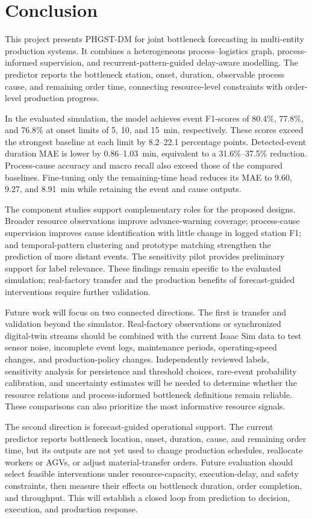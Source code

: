 \chapter{Conclusion}
\label{ch:conclusion}

This project presents PHGST-DM for joint bottleneck forecasting in multi-entity production systems. It combines a heterogeneous process--logistics graph, process-informed supervision, and recurrent-pattern-guided delay-aware modelling. The predictor reports the bottleneck station, onset, duration, observable process cause, and remaining order time, connecting resource-level constraints with order-level production progress.

In the evaluated simulation, the model achieves event F1-scores of 80.4\%, 77.8\%, and 76.8\% at onset limits of 5, 10, and 15~min, respectively. These scores exceed the strongest baseline at each limit by 8.2--22.1 percentage points. Detected-event duration MAE is lower by 0.86--1.03~min, equivalent to a 31.6\%--37.5\% reduction. Process-cause accuracy and macro recall also exceed those of the compared baselines. Fine-tuning only the remaining-time head reduces its MAE to 9.60, 9.27, and 8.91~min while retaining the event and cause outputs.

The component studies support complementary roles for the proposed designs. Broader resource observations improve advance-warning coverage; process-cause supervision improves cause identification with little change in logged station F1; and temporal-pattern clustering and prototype matching strengthen the prediction of more distant events. The sensitivity pilot provides preliminary support for label relevance. These findings remain specific to the evaluated simulation; real-factory transfer and the production benefits of forecast-guided interventions require further validation.

Future work will focus on two connected directions. The first is transfer and validation beyond the simulator. Real-factory observations or synchronized digital-twin streams should be combined with the current Isaac Sim data to test sensor noise, incomplete event logs, maintenance periods, operating-speed changes, and production-policy changes. Independently reviewed labels, sensitivity analysis for persistence and threshold choices, rare-event probability calibration, and uncertainty estimates will be needed to determine whether the resource relations and process-informed bottleneck definitions remain reliable. These comparisons can also prioritize the most informative resource signals.

The second direction is forecast-guided operational support. The current predictor reports bottleneck location, onset, duration, cause, and remaining order time, but its outputs are not yet used to change production schedules, reallocate workers or AGVs, or adjust material-transfer orders. Future evaluation should select feasible interventions under resource-capacity, execution-delay, and safety constraints, then measure their effects on bottleneck duration, order completion, and throughput. This will establish a closed loop from prediction to decision, execution, and production response.
